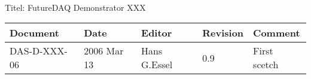 \\Titel: FutureDAQ Demonstrator XXX
\begin{table}[h]
\begin{tabular}{|p{2.8cm}|p{2.0cm}|p{3.0cm}|p{1.6cm}|p{5.0cm}|} \hline
Document   & Date        & Editor       & Revision & Comment \\
\hline DAS-D-XXX-06 & 2006 Mar 13 & Hans G.Essel & 0.9      &
First scetch \\ \hline
\end{tabular}
\end{table}
